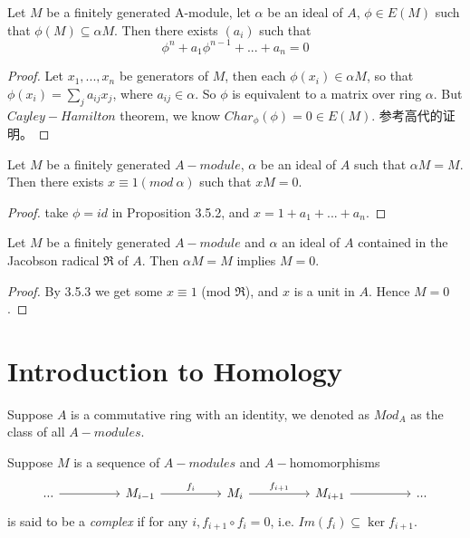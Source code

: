 \documentclass[11pt,fleqn]{book} %
\begin{document}
\begin{CJK}{UTF8}{gkai}
\begin{proposition}
	Let $M$ be a finitely generated A-module, let $\alpha$ be an ideal of $A$, $\phi \in E(M)$ such that $\phi(M) \subseteq \alpha M$. Then there exists $(a_i)$ such that 
	\[\phi^n + a_1\phi^{n-1}+...+a_n = 0\]
\end{proposition}
\begin{proof}
	Let $x_1,...,x_n$ be generators of $M$, then each $\phi(x_i) \in \alpha M$, so that $\phi(x_i) = \sum_{j}a_{ij}x_j$, where $a_{ij} \in \alpha$. So $\phi$ is equivalent to a matrix over ring $\alpha$.
	But $Cayley-Hamilton$ theorem, we know $Char_{\phi}(\phi) = 0 \in E(M)$.  参考高代的证明。
\end{proof}

\begin{corollary}
	Let $M$ be a finitely generated $A-module$, $\alpha$ be an ideal of $A$ such that $\alpha M=M$. Then there exists $x \equiv 1 (mod \ \alpha)$ such that $xM = 0$.
\end{corollary}
\begin{proof}
	take $\phi = id$ in Proposition 3.5.2, and $x = 1 + a_1 + ... + a_n$.
\end{proof}

\begin{theorem}
	 Let $M$ be a finitely generated $A-module$ and $\alpha$ an ideal of $A$ contained in the Jacobson radical $\mathfrak{R}$ of $A$. Then $\alpha M = M$ implies $M = 0$.
\end{theorem}
\begin{proof}
	By 3.5.3 we get some $x \equiv 1$ (mod $\mathfrak R$), and $x$ is a unit in $A$. Hence $M = 0$.
\end{proof}


\chapter{Introduction to Homology}

\begin{definition}
	 Suppose $A$ is a commutative ring with an identity, we denoted as $Mod_A$ as the class of all $A-modules$.
\end{definition}

\begin{definition}
	 Suppose $M$ is a sequence of $A-modules$ and $A-$homomorphisms
	\[\begin{tikzcd}
		{...} && {M_{i-1}} && {M_i} && {M_{i+1}} && {...}
		\arrow[from=1-1, to=1-3]
		\arrow["{f_i}", from=1-3, to=1-5]
		\arrow["{f_{i+1}}", from=1-5, to=1-7]
		\arrow[from=1-7, to=1-9]
	\end{tikzcd}\]
	is said to be a {\it complex} if for any $i, f_{i+1}\circ f_i = 0$, i.e. $Im(f_i)\subseteq \ker f_{i+1}$. 


\end{definition}
\end{CJK}
\end{document}

